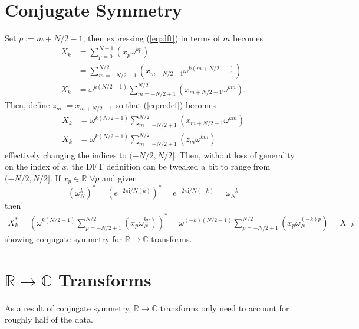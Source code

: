 \documentclass{article}
\begin{document}
\section {Conjugate Symmetry}
%
Set $p := m + N/2 - 1$, then expressing (\ref{eq:dft}) in terms of $m$ becomes
%
\begin {equation} \label {eq:redef}
\begin {aligned}
X_k &= \sum_{p = 0}^{N-1} (x_p \omega^{k p}) \\
    &= \sum_{m = -N/2 + 1}^{N/2} (x_{m + N/2 - 1} \omega^{k (m + N/2 - 1)}) \\
X_k &= \omega^{k (N/2 - 1)} \sum_{m = -N/2 + 1}^{N/2} (x_{m + N/2 - 1} \omega^{k m}).
\end {aligned}
\end {equation}
%
Then, define $z_m := x_{m + N/2 - 1}$ so that (\ref{eq:redef}) becomes
%
\begin {equation}
\begin {aligned}
X_k &= \omega^{k (N/2 - 1)} \sum_{m = -N/2 + 1}^{N/2} (x_{m + N/2 - 1} \omega^{k m}) \\
X_k &= \omega^{k (N/2 - 1)} \sum_{m = -N/2 + 1}^{N/2} (z_m \omega^{k m})
\end {aligned}
\end {equation}
%
effectively changing the indices to $(-N/2, N/2]$.
Then, without loss of generality on the index of $x$, the DFT definition can be tweaked a bit to range from $(-N/2, N/2]$.
If $x_p \in \mathbb {R}$ $\forall p$ and given
%
\begin {equation}
\left (\omega_N^{k} \right)^*
 = \left (e^{-2 \pi \mathrm {i} / N (k)} \right)^* 
 = e^{-2 \pi \mathrm {i} / N (-k)} 
 = \omega_{N}^{-k}
\end {equation}
%
then
%
\begin {equation}
\begin {aligned}
X_k^* = \left( \omega^{k (N/2 - 1)} \sum_{p = -N/2+1}^{N/2} (x_p \omega_N^{k p}) \right)^*
      = \omega^{(-k) (N/2 - 1)} \sum_{p = -N/2+1}^{N/2} (x_p \omega_N^{(-k) p})
      = X_{-k}
\end {aligned}
\end {equation}
%
showing conjugate symmetry for $\mathbb{R} \rightarrow \mathbb{C}$ transforms.

\section {$\mathbb{R} \rightarrow \mathbb{C}$ Transforms}
%
As a result of conjugate symmetry, $\mathbb{R} \rightarrow \mathbb{C}$ transforms only need to account for roughly half of the data.
\end{document}
